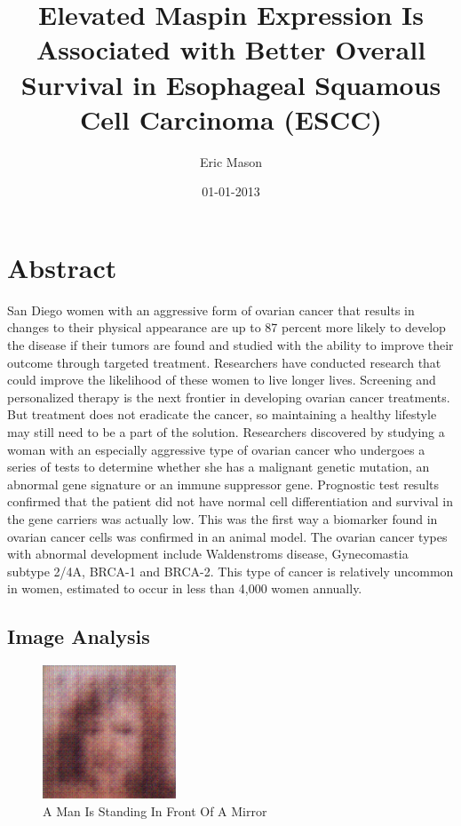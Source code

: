 \documentclass{article}%
\title{Elevated Maspin Expression Is Associated with Better Overall Survival in Esophageal Squamous Cell Carcinoma (ESCC)}%
\author{Eric Mason}%
\affil{Department of Pediatrics and Molecular and Cellular Oncology, The University of Texas M. D. Anderson Cancer Center, Houston, TX, USA}%
\date{01{-}01{-}2013}%
\begin{document}
%
\normalsize%
\maketitle%
\section{Abstract}%
\label{sec:Abstract}%
San Diego women with an aggressive form of ovarian cancer that results in changes to their physical appearance are up to 87 percent more likely to develop the disease if their tumors are found and studied with the ability to improve their outcome through targeted treatment.\newline%
Researchers have conducted research that could improve the likelihood of these women to live longer lives.\newline%
Screening and personalized therapy is the next frontier in developing ovarian cancer treatments. But treatment does not eradicate the cancer, so maintaining a healthy lifestyle may still need to be a part of the solution.\newline%
Researchers discovered by studying a woman with an especially aggressive type of ovarian cancer who undergoes a series of tests to determine whether she has a malignant genetic mutation, an abnormal gene signature or an immune suppressor gene.\newline%
Prognostic test results confirmed that the patient did not have normal cell differentiation and survival in the gene carriers was actually low. This was the first way a biomarker found in ovarian cancer cells was confirmed in an animal model.\newline%
The ovarian cancer types with abnormal development include Waldenstroms disease, Gynecomastia subtype 2/4A, BRCA{-}1 and BRCA{-}2. This type of cancer is relatively uncommon in women, estimated to occur in less than 4,000 women annually.

%
\subsection{Image Analysis}%
\label{subsec:ImageAnalysis}%


\begin{figure}[h!]%
\centering%
\includegraphics[width=150px]{500_fake_images/samples_5_397.png}%
\caption{A Man Is Standing In Front Of A Mirror}%
\end{figure}

%
\end{document}
